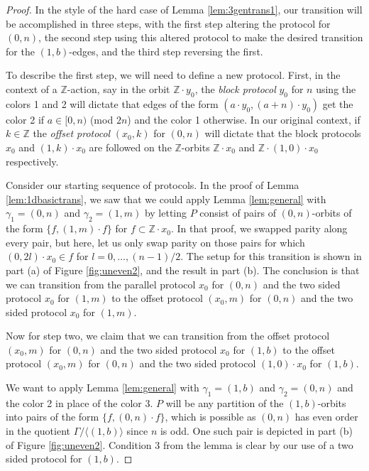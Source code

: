 \documentclass[10pt,a4paper]{article}
\newcommand{\0}{\varnothing}
\newcommand{\Z}{\mathbb{Z}}
\begin{document}
\begin{proof}
In the style of the hard case of Lemma \ref{lem:3gentrans1}, our transition will be accomplished in three steps, with the first step altering the protocol for $(0,n)$, the second step using this altered protocol to make the desired transition for the $(1,b)$-edges, and the third step reversing the first.

To describe the first step, we will need to define a new protocol. First, in the context of a $\Z$-action, say in the orbit $\Z \cdot y_0$, the \textit{block protocol} $y_0$ for $n$ using the colors 1 and 2 will dictate that edges of the form $(a \cdot y_0 , (a+n) \cdot y_0)$ get the color 2 if $a \in [0,n)$ (mod $2n$) and the color 1 otherwise. In our original context, if $k \in \Z$ the \textit{offset protocol} $(x_0,k)$ for $(0,n)$ will dictate that the block protocols $x_0$ and $(1,k) \cdot x_0$ are followed on the $\Z$-orbits $\Z \cdot x_0$ and $\Z \cdot (1,0) \cdot x_0$ respectively.

Consider our starting sequence of protocols. In the proof of Lemma \ref{lem:1dbasictrans}, we saw that we could apply Lemma \ref{lem:general} with $\gamma_1 = (0,n)$ and $\gamma_2 = (1,m)$ by letting $P$ consist of pairs of $(0,n)$-orbits of the form $\{f,(1,m) \cdot f\}$ for $f \subset \Z \cdot x_0$. In that proof, we swapped parity along every pair, but here, let us only swap parity on those pairs for which $(0,2l) \cdot x_0 \in f$ for $l=0,\ldots,(n-1)/2$. The setup for this transition is shown in part (a) of Figure \ref{fig:uneven2}, and the result in part (b). The conclusion is that we can transition from the parallel protocol $x_0$ for $(0,n)$ and the two sided protocol $x_0$ for $(1,m)$ to the offset protocol $(x_0,m)$ for $(0,n)$ and the two sided protocol $x_0$ for $(1,m)$.

Now for step two, we claim that we can transition from the offset protocol $(x_0,m)$ for $(0,n)$ and the two sided protocol $x_0$ for $(1,b)$ to the offset protocol $(x_0,m)$ for $(0,n)$ and the two sided protocol $(1,0) \cdot x_0$ for $(1,b)$.

We want to apply Lemma \ref{lem:general} with $\gamma_1 = (1,b)$ and $\gamma_2 = (0,n)$ and the color 2 in place of the color 3. $P$ will be any partition of the $(1,b)$-orbits into pairs of the form $\{f, (0,n) \cdot f\}$, which is possible as $(0,n)$ has even order in the quotient $\Gamma / \langle (1,b) \rangle$ since $n$ is odd. One such pair is depicted in part (b) of Figure \ref{fig:uneven2}. Condition 3 from the lemma is clear by our use of a two sided protocol for $(1,b)$.


\end{proof}
\end{document}

